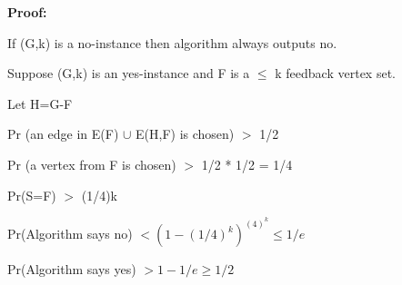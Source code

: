 \newpage
\textbf{Proof:}

If (G,k) is a no-instance then algorithm always outputs no.

Suppose (G,k) is an yes-instance and F is a $\leq$ k feedback vertex set.

Let H=G-F 

\hspace*{1.5cm} Pr (an edge in E(F) $\cup$ E(H,F) is chosen) $>$ 1/2 

\hspace*{1.5cm} Pr (a vertex from F is chosen) $>$ 1/2 * 1/2 = 1/4 

\hspace*{1.5cm} Pr(S=F) $>$ (1/4)k 

\hspace*{1.5cm} Pr(Algorithm says no) $< (1-(1/4)^k)^{(4)^k} \leq 1/e $ 

\hspace*{1.5cm} Pr(Algorithm says yes) $> 1- 1/e \geq 1/2 $



